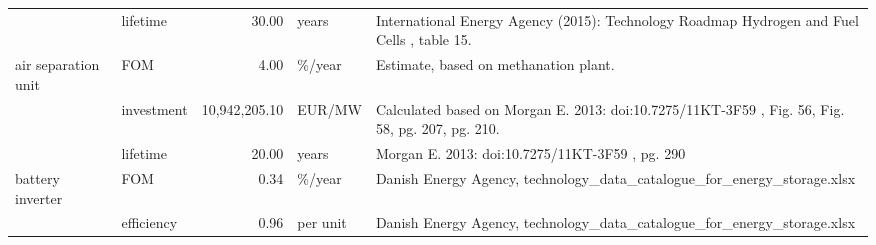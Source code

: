 \begin{longtable}{p{5cm}p{3cm}rp{3cm}p{11cm}}
                      & lifetime &          30.00 &                             years &                                                                                                                                                                                                                                           International Energy Agency (2015): Technology Roadmap Hydrogen and Fuel Cells , table 15. \\
air separation unit & FOM &           4.00 &                            \%/year &                                                                                                                                                                                                                                                                                                Estimate, based on methanation plant. \\
                      & investment &  10,942,205.10 &                            EUR/MW &                                                                                                                                                                                                                                      Calculated based on Morgan E. 2013: doi:10.7275/11KT-3F59 , Fig. 56, Fig. 58, pg. 207, pg. 210. \\
                      & lifetime &          20.00 &                             years &                                                                                                                                                                                                                                                                                      Morgan E. 2013: doi:10.7275/11KT-3F59 , pg. 290 \\
battery inverter & FOM &           0.34 &                            \%/year &                                                                                                                                                                                                                                                              Danish Energy Agency, technology\_data\_catalogue\_for\_energy\_storage.xlsx \\
                      & efficiency &           0.96 &                          per unit &                                                                                                                                                                                                                                                              Danish Energy Agency, technology\_data\_catalogue\_for\_energy\_storage.xlsx \\

\end{longtable}
